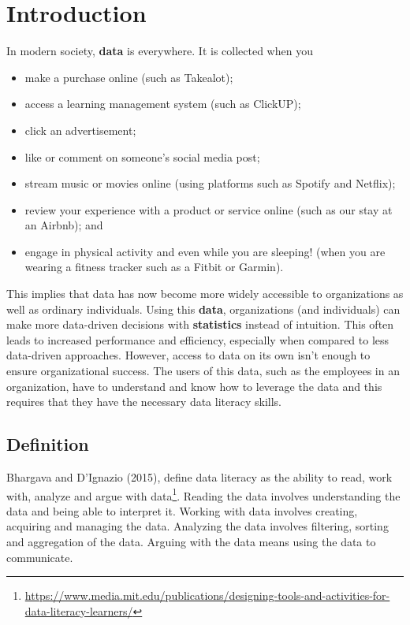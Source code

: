 \documentclass[
]{book}
\begin{document}
\section{Introduction}\label{sec1-1}

In modern society, \textbf{data} is everywhere. It is collected when you

\begin{itemize}
\item
  make a purchase online (such as Takealot);
\item
  access a learning management system (such as ClickUP);
\item
  click an advertisement;
\item
  like or comment on someone's social media post;
\item
  stream music or movies online (using platforms such as Spotify and Netflix);
\item
  review your experience with a product or service online (such as our stay at an Airbnb); and
\item
  engage in physical activity and even while you are sleeping! (when you are wearing a fitness tracker such as a Fitbit or Garmin).
\end{itemize}

This implies that data has now become more widely accessible to organizations as well as ordinary individuals. Using this \textbf{data}, organizations (and individuals) can make more data-driven decisions with \textbf{statistics} instead of intuition. This often leads to increased performance and efficiency, especially when compared to less data-driven approaches. However, access to data on its own isn't enough to ensure organizational success. The users of this data, such as the employees in an organization, have to understand and know how to leverage the data and this requires that they have the necessary data literacy skills.

\subsection{Definition}\label{definition}

Bhargava and D'Ignazio (2015), define data literacy as the ability to read, work with, analyze and argue with data\footnote{\url{https://www.media.mit.edu/publications/designing-tools-and-activities-for-data-literacy-learners/}}. Reading the data involves understanding the data and being able to interpret it. Working with data involves creating, acquiring and managing the data. Analyzing the data involves filtering, sorting and aggregation of the data. Arguing with the data means using the data to communicate.
\end{document}
